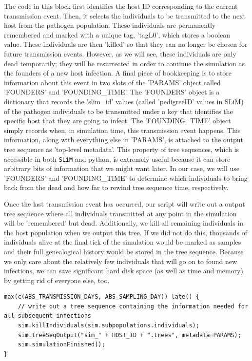 \documentclass[12pt]{article}
\newcommand{\slim}[0]{\texttt{SLiM}\xspace}
\begin{document}
The code in this block first identifies the host ID corresponding to the current transmission event. Then, it selects the individuals to be transmitted to the next host from the
pathogen population. These individuals are permanently remembered and marked with a unique tag, 'tagL0', which stores a boolean value. These individuals are then 'killed'
so that they can no longer be chosen for future transmission events. However, as we will see, these individuals are only dead temporarily; they will be resurrected in order to
continue the simulation as the founders of a new host infection. A final piece of bookkeeping is to store information about this event in two slots of the 'PARAMS' object
called 'FOUNDERS' and 'FOUNDING\_TIME'. The 'FOUNDERS' object is a dictionary that records the 'slim\_id' values (called 'pedigreeID' values in SLiM) of the pathogen
individuals to be transmitted under a key that identifies the specific host that they are going to infect. The 'FOUNDING\_TIME' object simply records when, in simulation time,
this transmission event happens. This information, along with everything else in 'PARAMS', is attached to the output tree sequence as 'top-level metadata'. This property
of tree sequences, which is accessible in both \slim and python, is extremely useful because it can store arbitrary bits of information that we might want later. In our case,
we will use 'FOUNDERS' and 'FOUNDING\_TIME' to determine which individuals to bring back from the dead and how far to rewind tree sequence time, respectively.

Once the last transmission event has occurred, our script will write out a output tree sequence where all individuals transmitted at any point in the simulation will be 'remembered'
but dead. Additionally, we kill all remaining individuals in the host population when we output this tree. If we did not do this, thousands of individuals alive at the final tick of
the simulation would be marked as samples and their full genealogical history would be stored in the tree sequence. Because we only care about the relatively few individuals
that will go on to found new infections, we can save significant hard disk space (as well as time and memory) by getting rid of everyone else, too.

\begin{verbatim}
max(c(ABS_TRANSMISSION_DAYS, ABS_SAMPLING_DAY)) late() {
	// write out a tree sequence containing the information needed for all subsequent infections
	sim.killIndividuals(sim.subpopulations.individuals);
	sim.treeSeqOutput("sim_" + HOST_ID + ".trees", metadata=PARAMS);
	sim.simulationFinished();
}
\end{verbatim}
\end{document}
